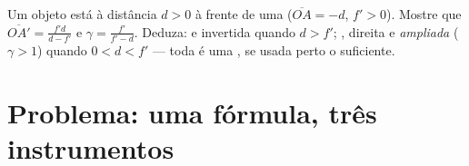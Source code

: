 \begin{exercise}[$\star\star\star$]\label{exo:g11:lenses-and-eye:15}
Um objeto  está à distância $d > 0$ à frente de uma  ($\overline{OA} = -d$, $f' > 0$). Mostre que
$\overline{OA'} = \frac{f'd}{d - f'}$ e
$\gamma = \frac{f'}{f' - d}$. Deduza:  e invertida quando $d > f'$;
, direita e \emph{ampliada} ($\gamma > 1$) quando $0 < d < f'$ ---
toda  é uma , se usada perto o suficiente.
\end{exercise}

\section{Problema: uma fórmula, três instrumentos}

